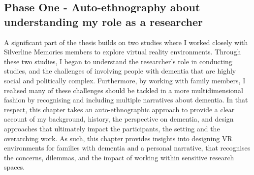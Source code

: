 \begin{table}[htp]
\centering
\caption{Overview of collected data}
\label{tab:OverviewDataCollection}
\end{table}

\subsection{Phase One - Auto-ethnography about understanding my role as a researcher}

A significant part of the thesis builds on two studies where I worked closely with Silverline Memories members to explore virtual reality environments. Through these two studies, I began to understand the researcher's role in conducting studies, and the challenges of involving people with dementia that are highly social and politically complex. Furthermore, by working with family members, I realised many of these challenges should be tackled in a more multidimensional fashion by recognising and including multiple narratives about dementia. In that respect, this chapter takes an auto-ethnographic approach to provide a clear account of my background, history, the perspective on dementia, and design approaches that ultimately impact the participants, the setting and the overarching work. As such, this chapter provides insights into designing VR environments for families with dementia and a personal narrative, that recognises the concerns, dilemmas, and the impact of working within sensitive research spaces. 

